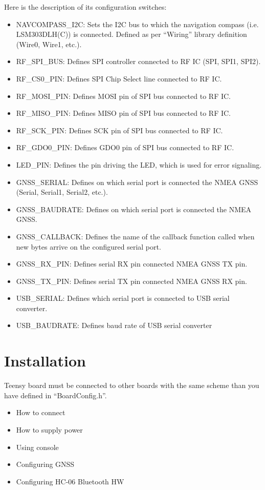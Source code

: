 \documentclass{report}
\begin{document}
Here is the description of its configuration switches:

\begin{itemize}
\item NAVCOMPASS\_I2C: Sets the I2C bus to which the navigation compass (i.e. LSM303DLH(C)) is connected. Defined as per “Wiring” library definition (Wire0, Wire1, etc.).
\item RF\_SPI\_BUS: Defines SPI controller connected to RF IC (SPI, SPI1, SPI2).
\item RF\_CS0\_PIN: Defines SPI Chip Select line connected to RF IC.
\item RF\_MOSI\_PIN: Defines MOSI pin of SPI bus connected to RF IC.
\item RF\_MISO\_PIN: Defines MISO pin of SPI bus connected to RF IC.
\item RF\_SCK\_PIN: Defines SCK pin of SPI bus connected to RF IC.
\item RF\_GDO0\_PIN: Defines GDO0 pin of SPI bus connected to RF IC.
\item LED\_PIN: Defines the pin driving the LED, which is used for error signaling.
\item GNSS\_SERIAL: Defines on which serial port is connected the NMEA GNSS (Serial, Serial1, Serial2, etc.).
\item GNSS\_BAUDRATE: Defines on which serial port is connected the NMEA GNSS.
\item GNSS\_CALLBACK: Defines the name of the callback function called when new bytes arrive on the
configured serial port.
\item GNSS\_RX\_PIN: Defines serial RX pin connected NMEA GNSS TX pin.
\item GNSS\_TX\_PIN: Defines serial TX pin connected NMEA GNSS RX pin.
\item USB\_SERIAL: Defines which serial port is connected to USB serial converter.
\item USB\_BAUDRATE: Defines baud rate of USB serial converter
\end{itemize}

\chapter{Installation}

Teensy board must be connected to other boards with the same scheme than you have defined in “BoardConfig.h”.

\begin{itemize}
\item How to connect
\item How to supply power
\item Using console
\item Configuring GNSS
\item Configuring HC-06 Bluetooth HW
\end{itemize}
\end{document}
